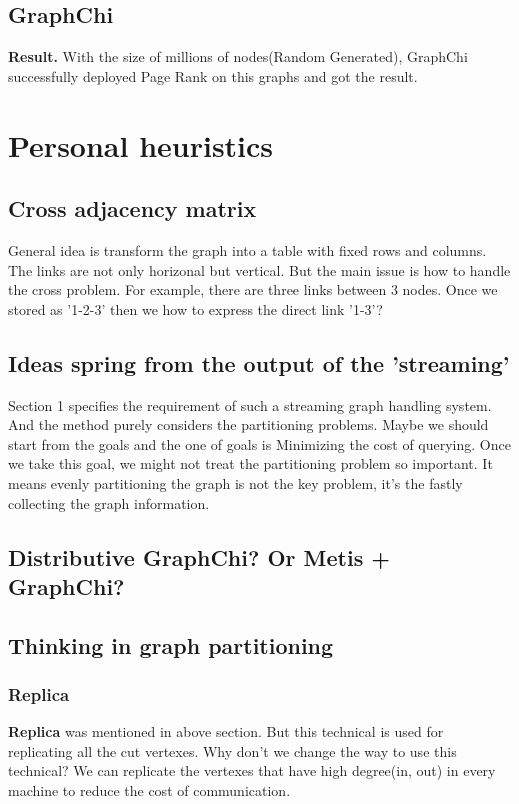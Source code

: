 \documentclass{article}
\begin{document}
	\subsection{GraphChi}
	\textbf{Result.} With the size of millions of nodes(Random Generated), GraphChi successfully deployed Page Rank\cite{pagerank} on this graphs and got the result.

	\newpage
	\section{Personal heuristics}
	\subsection{Cross adjacency matrix}
	General idea is transform the graph into a table with fixed rows and columns. The links are not only horizonal but vertical. But the main issue is how to handle the cross problem. For example, there are three links between 3 nodes. Once we stored as '1-2-3' then we how to express the direct link '1-3'?

	\subsection{Ideas spring from the output of the 'streaming'}
	Section 1 specifies the requirement of such a streaming graph handling system. And the method\cite{stanton2012streaming} purely considers the partitioning problems. Maybe we should start from the goals and the one of goals is Minimizing the cost of querying. Once we take this goal, we might not treat the partitioning problem so important. It means evenly partitioning the graph is not the key problem, it's the fastly collecting the graph information.

	\subsection{Distributive GraphChi? Or Metis + GraphChi?}

	\subsection{Thinking in graph partitioning}
	\subsubsection{Replica}
	\textbf{Replica} was mentioned in above section. But this technical is used for replicating all the cut vertexes. Why don't we change the way to use this technical? We can replicate the vertexes that have high degree(in, out) in every machine to reduce the cost of communication.
\end{document}
